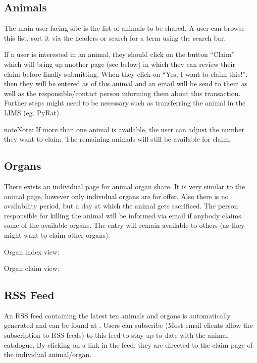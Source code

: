 \documentclass[letterpaper,10pt,openany,oneside,english]{sphinxmanual}
\begin{document}
\subsection{Animals}
\label{\detokenize{index:animals}}
The main user-facing site is the list of animals to be shared. A user can browse this list, sort it
via the headers or search for a term using the search bar.

\noindent{}

If a user is interested in an animal, they should click on the button “Claim” which will bring up
another page (see below) in which they can review their claim before finally submitting. When they
click on “Yes, I want to claim this!”, then they will be entered as  of this animal and
an email will be send to them as well as the responsible/contact person informing them about this
transaction. Further steps might need to be necessary such as transferring the animal in the LIMS
(eg. PyRat).

\begin{sphinxadmonition}{note}{Note:}
If more than one animal is available, the user can adjust the number they want to claim.
The remaining animals will still be available for claim.
\end{sphinxadmonition}

\noindent{}


\subsection{Organs}
\label{\detokenize{index:organs}}
There exists an individual page for animal organ share. It is very similar to the animal page,
however only individual organs are for offer. Also there is no availability period, but a day at
which the animal gets sacrificed. The person responsible for killing the animal will be informed via
email if anybody claims some of the available organs. The entry will remain available to others (as
they might want to claim other organs).

Organ index view:

\noindent{}

Organ claim view:

\noindent{}


\subsection{RSS Feed}
\label{\detokenize{index:rss-feed}}
An RSS feed containing the latest ten animals and organs is automatically generated and can be found at
. Users can subscribe (Most email clients allow the subscription
to RSS feeds) to this feed to stay up-to-date with the animal catalogue. By clicking on a link in
the feed, they are directed to the claim page of the individual animal/organ.
\end{document}
